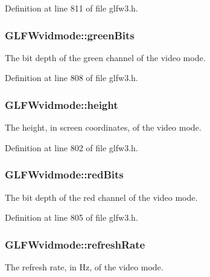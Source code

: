 Definition at line 811 of file glfw3.\-h.

\hypertarget{struct_g_l_f_wvidmode_a292fdd281f3485fb3ff102a5bda43faa}{
\subsubsection[{green\-Bits}]{ G\-L\-F\-Wvidmode\-::green\-Bits}}\label{struct_g_l_f_wvidmode_a292fdd281f3485fb3ff102a5bda43faa}
The bit depth of the green channel of the video mode. 

Definition at line 808 of file glfw3.\-h.

\hypertarget{struct_g_l_f_wvidmode_ac65942a5f6981695517437a9d571d03c}{
\subsubsection[{height}]{ G\-L\-F\-Wvidmode\-::height}}\label{struct_g_l_f_wvidmode_ac65942a5f6981695517437a9d571d03c}
The height, in screen coordinates, of the video mode. 

Definition at line 802 of file glfw3.\-h.

\hypertarget{struct_g_l_f_wvidmode_a6066c4ecd251098700062d3b735dba1b}{
\subsubsection[{red\-Bits}]{ G\-L\-F\-Wvidmode\-::red\-Bits}}\label{struct_g_l_f_wvidmode_a6066c4ecd251098700062d3b735dba1b}
The bit depth of the red channel of the video mode. 

Definition at line 805 of file glfw3.\-h.

\hypertarget{struct_g_l_f_wvidmode_a791bdd6c7697b09f7e9c97054bf05649}{
\subsubsection[{refresh\-Rate}]{ G\-L\-F\-Wvidmode\-::refresh\-Rate}}\label{struct_g_l_f_wvidmode_a791bdd6c7697b09f7e9c97054bf05649}
The refresh rate, in Hz, of the video mode. 

